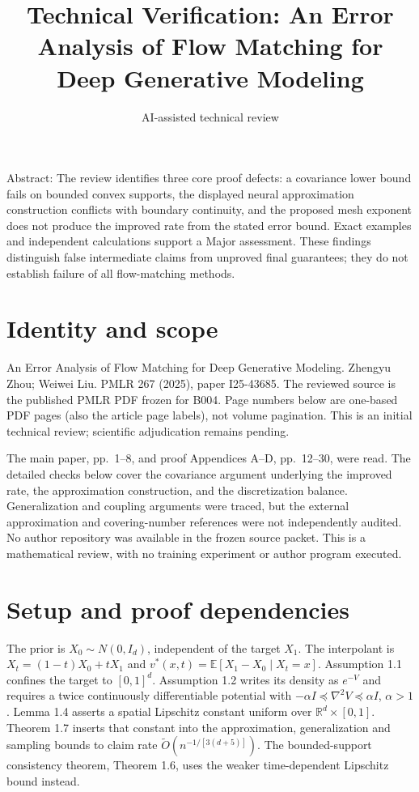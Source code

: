 \documentclass[10pt]{article}
\title{Technical Verification: An Error Analysis of Flow Matching for Deep Generative Modeling}
\author{AI-assisted technical review}
\date{}
\begin{document}
\maketitle
Abstract: The review identifies three core proof defects: a covariance lower bound fails on bounded convex supports, the displayed neural approximation construction conflicts with boundary continuity, and the proposed mesh exponent does not produce the improved rate from the stated error bound. Exact examples and independent calculations support a Major assessment. These findings distinguish false intermediate claims from unproved final guarantees; they do not establish failure of all flow-matching methods.\par
\section*{Identity and scope}
An Error Analysis of Flow Matching for Deep Generative Modeling. Zhengyu Zhou; Weiwei Liu. PMLR 267 (2025), paper I25-43685. The reviewed source is the published PMLR PDF frozen for B004. Page numbers below are one-based PDF pages (also the article page labels), not volume pagination. This is an initial technical review; scientific adjudication remains pending.\par
The main paper, pp. 1–8, and proof Appendices A–D, pp. 12–30, were read. The detailed checks below cover the covariance argument underlying the improved rate, the approximation construction, and the discretization balance. Generalization and coupling arguments were traced, but the external approximation and covering-number references were not independently audited. No author repository was available in the frozen source packet. This is a mathematical review, with no training experiment or author program executed.\par
\section*{Setup and proof dependencies}
The prior is \(X_0\sim N(0,I_d)\), independent of the target \(X_1\). The interpolant is \(X_t=(1-t)X_0+tX_1\) and \(v^*(x,t)=\mathbb E[X_1-X_0\mid X_t=x]\). Assumption 1.1 confines the target to \([0,1]^d\). Assumption 1.2 writes its density as \(e^{-V}\) and requires a twice continuously differentiable potential with \(-\alpha I\preceq\nabla^2 V\preceq\alpha I\), \(\alpha>1\). Lemma 1.4 asserts a spatial Lipschitz constant uniform over \(\mathbb R^d\times[0,1]\). Theorem 1.7 inserts that constant into the approximation, generalization and sampling bounds to claim rate \(\widetilde O(n^{-1/[3(d+5)]})\). The bounded-support consistency theorem, Theorem 1.6, uses the weaker time-dependent Lipschitz bound instead.\par
\end{document}
